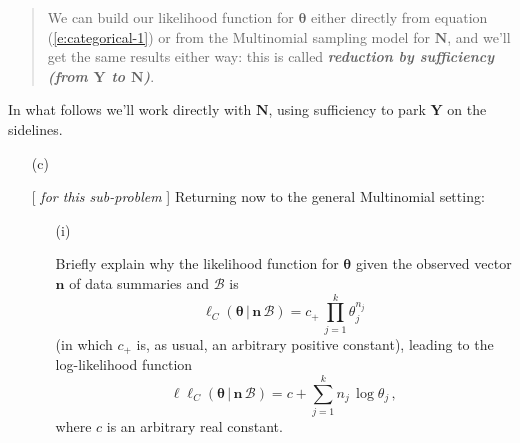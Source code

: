 \documentclass[12pt]{article}
\newcommand{\given}{\, | \,}
\newcommand{\bi}[1]{\textbf{\textit{#1}}}
\begin{document}
\begin{itemize}
\begin{quote}
We can build our likelihood function for $\bm{ \theta }$ either directly from equation (\ref{e:categorical-1}) or from the Multinomial sampling model for $\bm{ N }$, and we'll get the same results either way: this is called \bi{reduction by sufficiency (from $\bm{ Y }$ to $\bm{ N }$)}.

\end{quote}

In what follows we'll work directly with $\bm{ N }$, using sufficiency to park $\bm{ Y }$ on the sidelines.

\begin{itemize}
\item[(c)]

[ \textit{ for this sub-problem} ] \vspace*{0.025in} Returning now to the general Multinomial setting:

\begin{itemize}

\item[(i)]

Briefly explain why the likelihood function for $\bm{ \theta }$ given the observed vector $\bm{ n }$ of data summaries and $\mathcal{ B }$ is
\begin{equation} \label{e:multinomial-3}
\ell_C ( \bm{ \theta } \given \bm{ n } \, \mathcal{ B } ) = c_+ \, \prod_{ j = 1 }^k \theta_j^{ n_j }
\end{equation}
(in which $c_+$ is, as usual, an arbitrary positive constant), leading to the log-likelihood function
\begin{equation} \label{e:multinomial-4}
\ell \ell_C ( \bm{ \theta } \given \bm{ n } \, \mathcal{ B } ) = c + \sum_{ j = 1 }^k n_j \, \log \theta_j \, ,
\end{equation}
where $c$ is an arbitrary real constant. \fbox{\textbf{\textit{[5 points]}}} 


\end{itemize}
\end{itemize}
\end{itemize}
\end{document}
